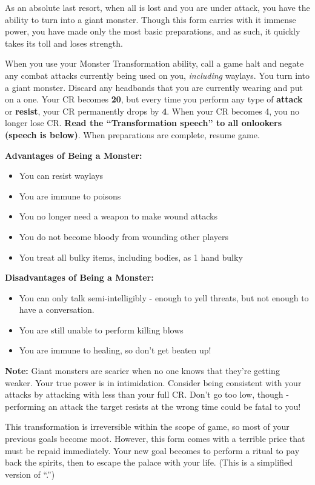 \documentclass[green]{NeptuneBall}
\begin{document}
\name{\gMonsterTransformation{}}

As an absolute last resort, when all is lost and you are under attack, you have the ability to turn into a giant monster. Though this form carries with it immense power, you have made only the most basic preparations, and as such, it quickly takes its toll and loses strength.

When you use your Monster Transformation ability, call a game halt and negate any combat attacks currently being used on you, \emph{including} waylays. You turn into a giant monster. Discard any  headbands that you are currently wearing and put on a  one. Your CR becomes {\bf 20}, but every time you perform any type of {\bf attack} or {\bf resist}, your CR permanently drops by {\bf 4}. When your CR becomes 4, you no longer lose CR. {\bf Read the ``Transformation speech'' to all onlookers (speech is below)}. When preparations are complete, resume game.

{\bf Advantages of Being a Monster:}
\begin{itemize}
\item You can resist waylays
\item You are immune to poisons
\item You no longer need a weapon to make wound attacks
\item You do not become bloody from wounding other players
\item You treat all bulky items, including bodies, as 1 hand bulky
\end{itemize}

{\bf Disadvantages of Being a Monster:}
\begin{itemize}
\item You can only talk semi-intelligibly - enough to yell threats, but not enough to have a conversation.
\item You are still unable to perform killing blows
\item You are immune to healing, so don't get beaten up!
\end{itemize}

{\bf Note:} Giant monsters are scarier when no one knows that they're getting weaker. Your true power is in intimidation. Consider being consistent with your attacks by attacking with less than your full CR. Don't go too low, though - performing an attack the target resists at the wrong time could be fatal to you! 

This transformation is irreversible within the scope of game, so most of your previous goals become moot. However, this form comes with a terrible price that must be repaid immediately. Your new goal becomes to perform a ritual to pay back the spirits, then to escape the palace with your life. (This is a simplified version of ``\gRitual{}.'')
\end{document}

